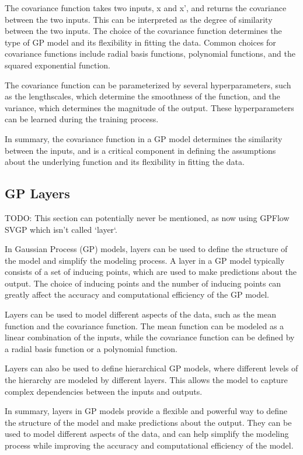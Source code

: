 \documentclass[12pt,a4paper]{report}
\begin{document}
The covariance function takes two inputs, x and x', and returns the covariance between the two inputs. 
This can be interpreted as the degree of similarity between the two inputs. 
The choice of the covariance function determines the type of GP model and its flexibility in fitting the data. 
Common choices for covariance functions include radial basis functions, polynomial functions, and the squared exponential function.

The covariance function can be parameterized by several hyperparameters, such as the lengthscales, which determine the smoothness of the function, and the variance, which determines the magnitude of the output. 
These hyperparameters can be learned during the training process.

In summary, the covariance function in a GP model determines the similarity between the inputs, and is a critical component in defining the assumptions about the underlying function and its flexibility in fitting the data.

\subsection{GP Layers}

TODO: This section can potentially never be mentioned, as now using GPFlow SVGP which isn't called `layer`.

In Gaussian Process (GP) models, layers can be used to define the structure of the model and simplify the modeling process. 
A layer in a GP model typically consists of a set of inducing points, which are used to make predictions about the output. 
The choice of inducing points and the number of inducing points can greatly affect the accuracy and computational efficiency of the GP model.

Layers can be used to model different aspects of the data, such as the mean function and the covariance function. 
The mean function can be modeled as a linear combination of the inputs, while the covariance function can be defined by a radial basis function or a polynomial function.

Layers can also be used to define hierarchical GP models, where different levels of the hierarchy are modeled by different layers. 
This allows the model to capture complex dependencies between the inputs and outputs.

In summary, layers in GP models provide a flexible and powerful way to define the structure of the model and make predictions about the output. 
They can be used to model different aspects of the data, and can help simplify the modeling process while improving the accuracy and computational efficiency of the model.
\end{document}
